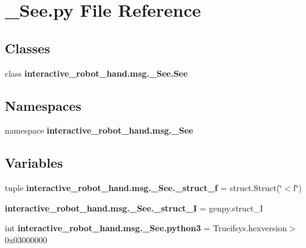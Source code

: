 \section{\-\_\-\-See.\-py File Reference}
\label{__See_8py}
\subsection*{Classes}
\begin{DoxyCompactItemize}
\item 
class {\bf interactive\-\_\-robot\-\_\-hand.\-msg.\-\_\-\-See.\-See}
\end{DoxyCompactItemize}
\subsection*{Namespaces}
\begin{DoxyCompactItemize}
\item 
namespace {\bf interactive\-\_\-robot\-\_\-hand.\-msg.\-\_\-\-See}
\end{DoxyCompactItemize}
\subsection*{Variables}
\begin{DoxyCompactItemize}
\item 
tuple {\bf interactive\-\_\-robot\-\_\-hand.\-msg.\-\_\-\-See.\-\_\-struct\-\_\-f} = struct.\-Struct(\char`\"{}$<$f\char`\"{})
\item 
{\bf interactive\-\_\-robot\-\_\-hand.\-msg.\-\_\-\-See.\-\_\-struct\-\_\-\-I} = genpy.\-struct\-\_\-\-I
\item 
int {\bf interactive\-\_\-robot\-\_\-hand.\-msg.\-\_\-\-See.\-python3} = Trueifsys.\-hexversion$>$0x03000000
\end{DoxyCompactItemize}
